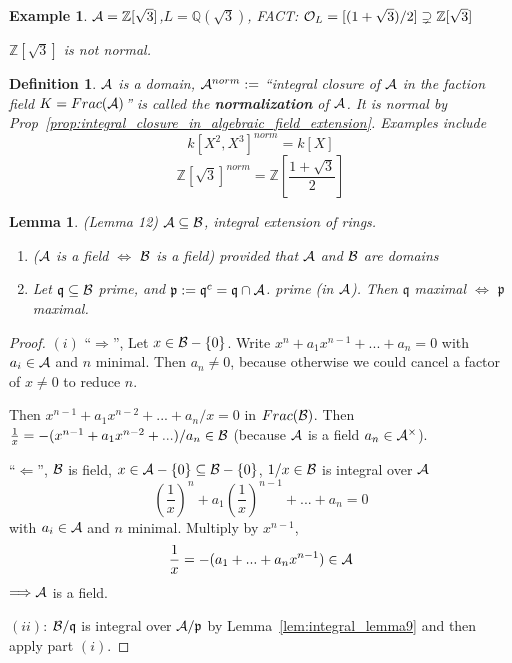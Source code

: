 \documentclass[11pt]{article}
\newtheorem{lemma}[thm]{Lemma}
\newtheorem{dfn}[thm]{Definition}
\newtheorem{ex}[thm]{Example}
\newcommand{\intg}{\mathbb Z}
\newcommand{\ratl}{\mathbb Q}
\newcommand{\scp}{{\mathfrak p}}
\newcommand{\scq}{\mathfrak q}
\newcommand{\cala}{{\cal A}}
\newcommand{\calb}{{\cal B}}
\newcommand{\calo}{{\cal O}}
\newcommand{\Lrta}{\Longrightarrow}
\newcommand{\Llta}{\Longleftarrow}
\newcommand{\Llrta}{\Longleftrightarrow}
\begin{document}
\begin{ex}
$\cala=\intg[\sqrt{3}]$,$L=\ratl(\sqrt{3})$,
FACT: $\calo_L=[(1+\sqrt{3})/2]\supsetneq \intg[\sqrt 3]$

$\intg[\sqrt{3}]$ is not normal.
\end{ex}

\begin{dfn}
$\cala$ is a domain, $\cala^{norm}:=$ ``integral closure of  $\cala$ in the faction field $K=Frac(\cala)$'' is called the \textbf{normalization} of $\cala$. It is normal by Prop~\ref{prop:integral_closure_in_algebraic_field_extension}.
Examples include
$$
k[X^2,X^3]^{norm}=k[X]
$$
$$
\intg[\sqrt{3}]^{norm}=\intg\left[\frac{1+\sqrt{3}}{2}\right]
$$
\end{dfn}
\begin{lemma}\label{integral_lemma12}(Lemma 12)
$\cala\subseteq \calb$, integral extension of rings.
\begin{enumerate}[label=(\roman*)]
\item ($\cala$ is a field $\Llrta$ $\calb$ is a field) provided that $\cala$ and $\calb$ are domains
\item  Let $\scq\subseteq \calb$ prime, and $\scp:=\scq^{c}=\scq\cap \cala$. prime (in $\cala$). Then 
$\scq$ maximal $\Llrta$ $\scp$ maximal.
\end{enumerate}
\end{lemma}
\begin{proof}
$(i)$ ``$\Lrta$'', Let $x\in \calb-\{0\}$. Write $x^n+a_1 x^{n-1}+...+a_n=0$ with $a_i\in\cala$ and $n$ minimal. Then $a_n\neq 0$, because otherwise we could cancel a factor of $x\neq 0$ to reduce $n$.

Then $x^{n-1}+a_1 x^{n-2}+...+a_n/x=0$ in $Frac(\calb)$. Then $\frac{1}{x}=-(x^{n-1}+a_1 x^{n-2}+...)/a_n\in \calb$ (because $\cala$ is a field $a_n\in\cala^\times$).

``$\Llta$'', $\calb$ is  field, $x\in\cala-\{0\}\subseteq\calb-\{0\}$, $1/x\in\calb$ is integral over $\cala$
$$
\left(\frac{1}{x}\right)^n+a_1 \left(\frac{1}{x}\right)^{n-1}+...+a_n=0
$$
with $a_i\in\cala$ and $n$ minimal. Multiply by $x^{n-1}$,
$$
\frac{1}{x}=-(a_1 +...+a_n x^{n-1})\in\cala
$$
$\Lrta\cala$ is a field.

$(ii)$:  $\calb/\scq$ is integral over $\cala/\scp$ by Lemma~\ref{lem:integral_lemma9} and then apply part $(i)$.

\end{proof}
\end{document}
